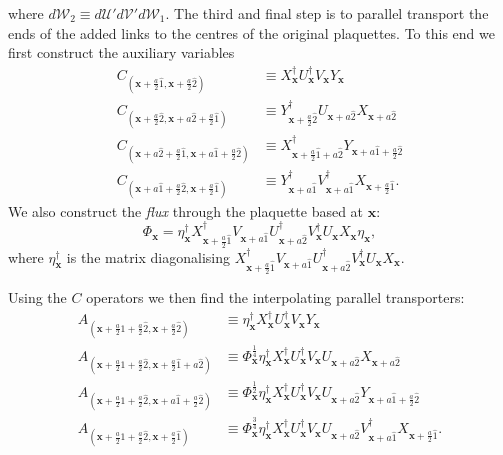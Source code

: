 \documentclass[12pt]{amsart}
\theoremstyle{definition}
\theoremstyle{remark}
\numberwithin{equation}{section}
\begin{document}
where $d\mathcal{W}_2 \equiv  d\mathcal{U}'d\mathcal{V}'d\mathcal{W}_1$.
The third and final step is to parallel transport the ends of the added links to the centres of the original plaquettes. To this end we first construct the auxiliary variables 
\begin{align}
	C_{(\mathbf{x}+\frac{a}{2}\hat{1}, \mathbf{x}+\frac{a}{2}\hat{2})} &\equiv X_{\mathbf{x}}^\dag U^\dag_{\mathbf{x}}V_\mathbf{x} Y_\mathbf{x} \\
	C_{(\mathbf{x}+\frac{a}{2}\hat{2}, \mathbf{x}+a\hat{2}+\frac{a}{2}\hat{1})} &\equiv Y_{\mathbf{x}+\frac{a}{2}\hat{2}}^\dag  U_{\mathbf{x}+a\hat{2}}X_{\mathbf{x} + a\hat{2}} \\
	C_{(\mathbf{x}+a\hat{2}+\frac{a}{2}\hat{1}, \mathbf{x}+a\hat{1}+\frac{a}{2}\hat{2})} &\equiv X_{\mathbf{x} + \frac{a}{2}\hat{1}+a\hat{2}}^\dag Y_{\mathbf{x}+a\hat{1}+\frac{a}{2}\hat{2}} \\
	C_{(\mathbf{x}+a\hat{1}+\frac{a}{2}\hat{2}, \mathbf{x}+\frac{a}{2}\hat{1})} &\equiv Y^\dag_{\mathbf{x}+a\hat{1}} V^\dag_{\mathbf{x}+a\hat{1}} X_{\mathbf{x}+\frac{a}{2}\hat{1}}.
\end{align}
We also construct the \emph{flux} through the plaquette based at $\mathbf{x}$:
\begin{equation}
	\Phi_\mathbf{x} = \eta^\dag_{\mathbf{x}} X_{\mathbf{x}+\frac{a}{2}\hat{1}}^\dag V_{\mathbf{x}+a\hat{1}} U_{\mathbf{x}+a\hat{2}}^\dag V_\mathbf{x}^\dag U_{\mathbf{x}}X_{\mathbf{x}}\eta_{\mathbf{x}},
\end{equation} 
where $\eta^\dag_{\mathbf{x}}$ is the matrix diagonalising $X_{\mathbf{x}+\frac{a}{2}\hat{1}}^\dag V_{\mathbf{x}+a\hat{1}} U_{\mathbf{x}+a\hat{2}}^\dag V_\mathbf{x}^\dag U_{\mathbf{x}}X_{\mathbf{x}}$.

Using the $C$ operators we then find the interpolating parallel transporters:
\begin{align}
	A_{(\mathbf{x}+\frac{a}{2}\hat{1}+\frac{a}{2}\hat{2}, \mathbf{x}+\frac{a}{2}\hat{2})} &\equiv \eta^\dag_{\mathbf{x}} X_{\mathbf{x}}^\dag U^\dag_{\mathbf{x}}V_\mathbf{x} Y_\mathbf{x} \\
	A_{(\mathbf{x}+\frac{a}{2}\hat{1}+\frac{a}{2}\hat{2}, \mathbf{x}+\frac{a}{2}\hat{1}+{a}\hat{2})} &\equiv \Phi_{\mathbf{x}}^{\frac14}\eta^\dag_{\mathbf{x}} X_{\mathbf{x}}^\dag U^\dag_{\mathbf{x}}V_\mathbf{x} U_{\mathbf{x}+a\hat{2}}X_{\mathbf{x} + a\hat{2}} \\
	A_{(\mathbf{x}+\frac{a}{2}\hat{1}+\frac{a}{2}\hat{2}, \mathbf{x}+{a}\hat{1}+\frac{a}{2}\hat{2})} &\equiv \Phi_{\mathbf{x}}^{\frac12}\eta^\dag_{\mathbf{x}} X_{\mathbf{x}}^\dag U^\dag_{\mathbf{x}}V_\mathbf{x} U_{\mathbf{x}+a\hat{2}} Y_{\mathbf{x}+a\hat{1}+\frac{a}{2}\hat{2}} \\
	A_{(\mathbf{x}+\frac{a}{2}\hat{1}+\frac{a}{2}\hat{2}, \mathbf{x}+\frac{a}{2}\hat{1})} &\equiv \Phi_{\mathbf{x}}^{\frac34}\eta^\dag_{\mathbf{x}} X_{\mathbf{x}}^\dag U^\dag_{\mathbf{x}}V_\mathbf{x}  U_{\mathbf{x}+a\hat{2}} V^\dag_{\mathbf{x}+a\hat{1}} X_{\mathbf{x}+\frac{a}{2}\hat{1}}.
\end{align}
\end{document}
